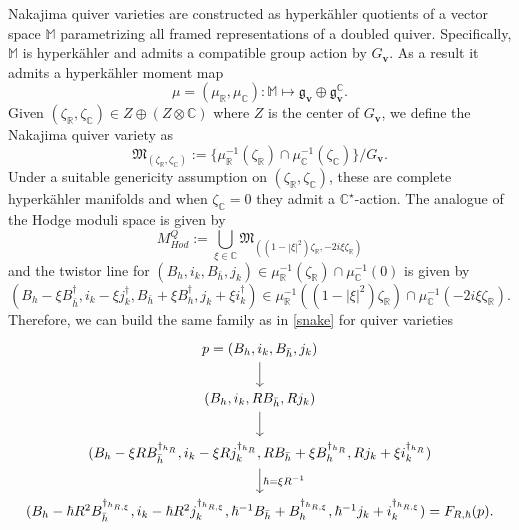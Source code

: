 \documentclass[12pt,oneside,reqno]{amsart}
\theoremstyle{definition}
\numberwithin{equation}{section}
\numberwithin{theorem}{section}
\newcommand{\R}{\mathbb{R}}
\newcommand{\C}{\mathbb{C}}
\begin{document}
Nakajima quiver varieties are constructed as hyperk\"ahler quotients of a vector space $\mathbb M$ parametrizing all framed representations of a doubled quiver. Specifically, $\mathbb M$ is hyperk\"ahler and admits a compatible group action by $G_{\mathbf{v}}$. As a result it admits a hyperk\"ahler moment map 
%
\begin{equation*}
\mu = (\mu_{\R}, \mu_{\C}): \mathbb M \longmapsto \mathfrak g_{\mathbf{v}}\oplus \mathfrak g_{\mathbf{v}}^{\C}.
\end{equation*}
%
Given $(\zeta_{\R},\zeta_{\C}) \in Z\oplus(Z\otimes\C)$ where $Z$ is the center of $G_{\mathbf{v}}$, we define the Nakajima quiver variety as 
%
\begin{equation*}
\mathfrak M_{(\zeta_{\R},\zeta_{\C})}:= \{ \mu_{\R}^{-1}(\zeta_{\R})\cap\mu_{\C}^{-1}(\zeta_{\C})\}/G_{\mathbf{v}}.
\end{equation*}
%
Under a suitable genericity assumption on $(\zeta_{\R},\zeta_{\C})$, these are complete hyperk\"ahler manifolds and when $\zeta_{\C}=0$ they admit a $\C^{\star}$-action. The analogue of the Hodge moduli space is given by 
%
\begin{equation*}
M^Q_{Hod} := \bigcup\limits_{\xi\in \C} \mathfrak M_{((1-|\xi|^2)\zeta_{\R}, -2i\xi\zeta_{\R})}
\end{equation*}
%
and the twistor line for $(B_h,i_k,B_{\bar h},j_k) \in \mu_{\R}^{-1}(\zeta_{\R})\cap\mu_{\C}^{-1}(0)$ is given by 
%
\begin{equation*} (B_h - \xi B_{\bar h}^{\dagger}, i_k - \xi j_k^{\dagger}, B_{\bar h} + \xi B_h^{\dagger}, j_k+ \xi i_k^{\dagger})\in \mu_{\R}^{-1}((1-|\xi|^2)\zeta_{\R})\cap\mu_{\C}^{-1}(-2i\xi\zeta_{\R}).
\end{equation*}
%
Therefore, we can build the same family as in \eqref{snake} for quiver varieties 
%
\begin{equation}\label{snake2}
\begin{tikzcd}
p= (B_h,i_k,B_{\bar h},j_k) \arrow{d} \\
(B_h,i_k,RB_{\bar h},Rj_k) \arrow{d} \\
(B_h - \xi R B_{\bar h}^{\dagger_{h_R}}, i_k - \xi Rj_k^{\dagger_{h_R}}, RB_{\bar h} + \xi B_h^{\dagger_{h_R}}, Rj_k+ \xi i_k^{\dagger_{h_R}}) \arrow{d}{\hbar = \xi R^{-1}} \\
(B_h - \hbar R^2 B_{\bar h}^{\dagger_{h_{R,\xi}}}, i_k - \hbar R^2j_k^{\dagger_{h_{R,\xi}}}, \hbar^{-1}B_{\bar h} +  B_h^{\dagger_{h_{R,\xi}}}, \hbar^{-1}j_k+ i_k^{\dagger_{h_{R,\xi}}}) = F_{R,\hbar}(p). 
\end{tikzcd}
\end{equation}
\end{document}
